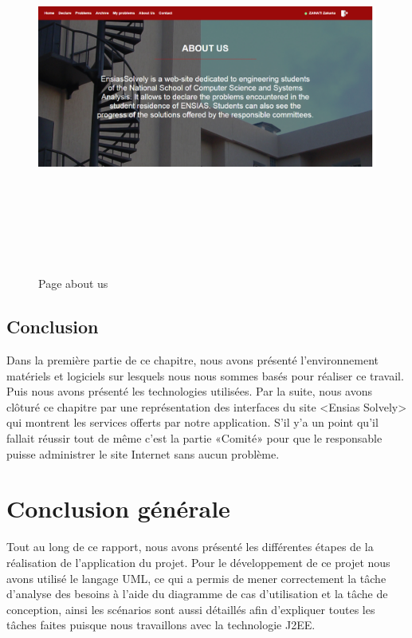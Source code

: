 \documentclass[11.5pt]{report}
\begin{document}
\newpage
\begin{figure}[h]
	
	\begin{center}
		\includegraphics[width=500pt,height=350pt]{aboutus.png} 
		\caption{Page about us}
	\end{center}
	
\end{figure}
\newpage

\section{Conclusion}
Dans la première partie de ce chapitre, nous avons présenté l’environnement matériels et logiciels sur lesquels nous nous sommes basés pour réaliser ce travail. Puis nous avons  présenté les technologies utilisées. Par la suite, nous avons clôturé ce chapitre par une représentation des interfaces du site <Ensias Solvely> qui montrent les services offerts par notre application. S’il y’a un point qu’il fallait réussir tout de même c’est la partie «Comité» pour que le responsable puisse administrer le site Internet sans aucun problème.
	
\chapter*{Conclusion générale}
Tout au long de ce rapport, nous avons présenté les différentes étapes de la réalisation de l’application du projet. Pour le développement de ce projet nous avons 
utilisé le langage UML, ce qui a permis de mener correctement la tâche d’analyse des besoins à l’aide du diagramme de cas d’utilisation et la tâche de conception, ainsi les scénarios sont aussi détaillés afin d’expliquer toutes les tâches faites puisque nous travaillons avec la technologie J2EE.
\end{document}
